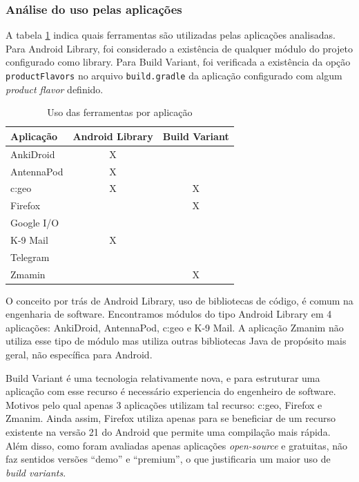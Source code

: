 \subsubsection{Análise do uso pelas aplicações}
A tabela \ref{tab:uso_ferramentas} indica quais ferramentas são utilizadas pelas
aplicações analisadas. Para Android Library, foi considerado a existência de qualquer
módulo do projeto configurado como library. Para Build Variant, foi verificada a
existência da opção \texttt{productFlavors} no arquivo \texttt{build.gradle} da
aplicação configurado com algum \textit{product flavor} definido.

\begin{table}[ht]
\centering
\caption{Uso das ferramentas por aplicação}
\label{tab:uso_ferramentas}
\begin{tabular}{|l|c|c|}
\hline
\textbf{Aplicação} & \textbf{Android Library} & \textbf{Build Variant} \\ \hline
AnkiDroid          & X                        &                        \\ \hline
AntennaPod         & X                        &                        \\ \hline
c:geo              & X                        & X                      \\ \hline
Firefox            &                          & X                      \\ \hline
Google I/O         &                          &                        \\ \hline
K-9 Mail           & X                        &                        \\ \hline
Telegram           &                          &                        \\ \hline
Zmamin             &                          & X                      \\ \hline
\end{tabular}
\end{table}

O conceito por trás de Android Library, uso de bibliotecas de código, é comum na
engenharia de software. Encontramos módulos do tipo Android Library em 4 aplicações:
AnkiDroid, AntennaPod, c:geo e K-9 Mail.
A aplicação Zmanim não utiliza esse tipo de módulo mas utiliza outras bibliotecas
Java de propósito mais geral, não específica para Android.

Build Variant é uma tecnologia relativamente nova, e para estruturar uma aplicação
com esse recurso é necessário experiencia do engenheiro de software. Motivos pelo
qual apenas 3 aplicações utilizam tal recurso: c:geo, Firefox e Zmanim.
Ainda assim, Firefox utiliza apenas
para se beneficiar de um recurso existente na versão 21 do Android que permite
uma compilação mais rápida. Além disso, como foram avaliadas apenas aplicações
\textit{open-source} e gratuitas, não faz sentidos versões “demo” e “premium”,
o que justificaria um maior uso de \textit{build variants}.


